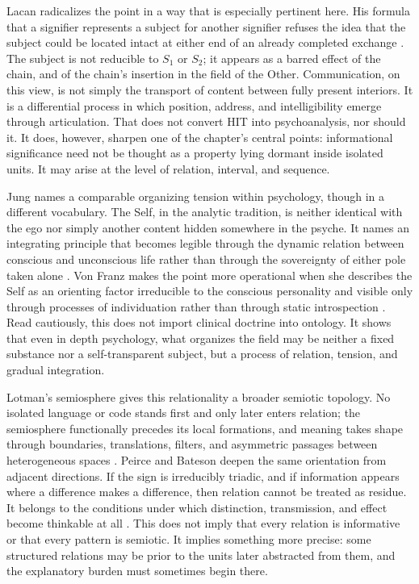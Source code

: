 Lacan radicalizes the point in a way that is especially pertinent here. His formula that a signifier represents a subject for another signifier refuses the idea that the subject could be located intact at either end of an already completed exchange \parencite{lacan_1966}. The subject is not reducible to $S_1$ or $S_2$; it appears as a barred effect of the chain, and of the chain's insertion in the field of the Other. Communication, on this view, is not simply the transport of content between fully present interiors. It is a differential process in which position, address, and intelligibility emerge through articulation. That does not convert HIT into psychoanalysis, nor should it. It does, however, sharpen one of the chapter's central points: informational significance need not be thought as a property lying dormant inside isolated units. It may arise at the level of relation, interval, and sequence.

Jung names a comparable organizing tension within psychology, though in a different vocabulary. The Self, in the analytic tradition, is neither identical with the ego nor simply another content hidden somewhere in the psyche. It names an integrating principle that becomes legible through the dynamic relation between conscious and unconscious life rather than through the sovereignty of either pole taken alone \parencite{jung_1959}. Von Franz makes the point more operational when she describes the Self as an orienting factor irreducible to the conscious personality and visible only through processes of individuation rather than through static introspection \parencite{vonfranz_1964}. Read cautiously, this does not import clinical doctrine into ontology. It shows that even in depth psychology, what organizes the field may be neither a fixed substance nor a self-transparent subject, but a process of relation, tension, and gradual integration.

Lotman's semiosphere gives this relationality a broader semiotic topology. No isolated language or code stands first and only later enters relation; the semiosphere functionally precedes its local formations, and meaning takes shape through boundaries, translations, filters, and asymmetric passages between heterogeneous spaces \parencite{lotman_2005}. Peirce and Bateson deepen the same orientation from adjacent directions. If the sign is irreducibly triadic, and if information appears where a difference makes a difference, then relation cannot be treated as residue. It belongs to the conditions under which distinction, transmission, and effect become thinkable at all \parencite{peirce_1931,bateson_1972}. This does not imply that every relation is informative or that every pattern is semiotic. It implies something more precise: some structured relations may be prior to the units later abstracted from them, and the explanatory burden must sometimes begin there.

